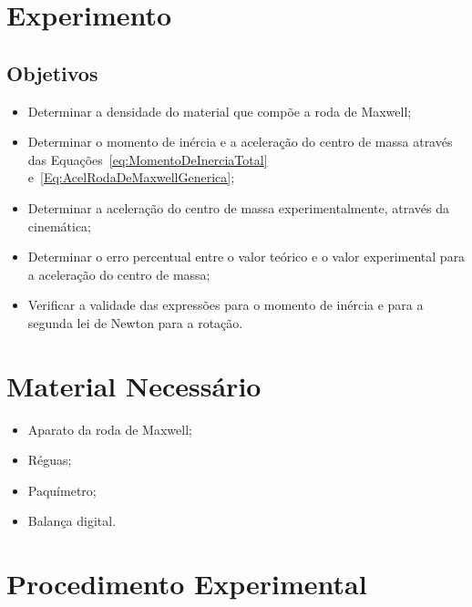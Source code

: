 \section{Experimento}

\subsection{Objetivos}
\label{Sec:ObjetivosRodaDeMaxwell}

\begin{itemize}
	\item Determinar a densidade do material que compõe a roda de Maxwell;
	\item Determinar o momento de inércia e a aceleração do centro de massa através das Equações~\eqref{eq:MomentoDeInerciaTotal} e~\eqref{Eq:AcelRodaDeMaxwellGenerica};
	\item Determinar a aceleração do centro de massa experimentalmente, através da cinemática;
    \item Determinar o erro percentual entre o valor teórico e o valor experimental para a aceleração do centro de massa;
    \item Verificar a validade das expressões para o momento de inércia e para a segunda lei de Newton para a rotação.
\end{itemize}

\section{Material Necessário}

\begin{itemize}
	\item Aparato da roda de Maxwell;
    \item Réguas;
    \item Paquímetro;
	\item Balança digital.
\end{itemize}

\section{Procedimento Experimental}

